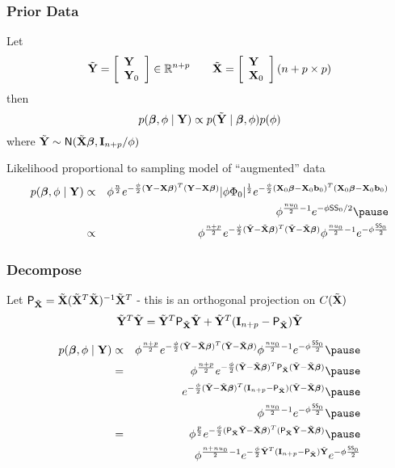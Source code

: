 \documentclass[handout]{beamer}\usepackage[]{graphicx}\usepackage[]{color}
\begin{document}
\begin{frame}
  \frametitle{Prior Data}
  Let
 $$\tilde{\mathbf{Y}} = \left[
   \begin{array}{l}
     \mathbf{Y} \\
\mathbf{Y}_0
   \end{array}
\right] \in \mathbb{R}^{n+p}  \qquad \tilde{\mathbf{X}} = \left[
   \begin{array}{l}
     \mathbf{Y} \\
\mathbf{X}_0
   \end{array}
\right]  (n+p \times p)  $$  \pause
then
$$p(\boldsymbol{\beta}, \phi \mid \mathbf{Y}) \propto p(\tilde{\mathbf{Y}} \mid \boldsymbol{\beta}, \phi) p(\phi)$$
where  $\tilde{\mathbf{Y}} \sim \textsf{N}( \tilde{\mathbf{X}} \boldsymbol{\beta}, \mathbf{I}_{n+p}/\phi)$
\pause

\vspace{24pt}
Likelihood proportional to sampling model of ``augmented'' data
\pause
\begin{eqnarray*}
 p(\b, \phi \mid \Y) &\propto&  \phi^{\frac n 2} e^{- \frac \phi 2 (\Y - \X \b)^T (\Y - \X \b)}
 |\phi \Phi_0|^{\frac 1 2} e^{- \frac{\phi}{2} (\X_0\b - \X_0\bv_0)^T  (\X_0\b - \X_0\bv_0) }  \\
& &  \phi^{\frac{nu_0}{2} - 1} e^{-\phi \SS_0/2} \pause \\
 &\propto&  \phi^{\frac {n + p}{ 2}} e^{- \frac \phi 2 (\tY - \tX \b)^T (\tY - \tX \b)}
\phi^{\frac{nu_0}{2} - 1} e^{-\phi \frac{ \SS_0}{ 2}}
  \end{eqnarray*}
\end{frame}
\begin{frame}
  \frametitle{Decompose}
  Let $\textsf{P}_{\tilde{\mathbf{X}}} = \tilde{\mathbf{X}} (\tilde{\mathbf{X}}^T\tilde{\mathbf{X}})^{-1} \tilde{\mathbf{X}}^T$ \pause -  this is an orthogonal
  projection on $C(\tilde{\mathbf{X}})$ \pause
 $$\tilde{\mathbf{Y}}^T\tilde{\mathbf{Y}} = \tilde{\mathbf{Y}}^T\textsf{P}_{\tilde{\mathbf{X}}}\tilde{\mathbf{Y}} +
  \tilde{\mathbf{Y}}^T(\mathbf{I}_{n+p} - \textsf{P}_{\tilde{\mathbf{X}}} )\tilde{\mathbf{Y}}$$

\pause

\begin{eqnarray*}
 p(\b, \phi \mid \Y)
 &\propto&  \phi^{\frac {n + p}{ 2}} e^{- \frac \phi 2 (\tY - \tX \b)^T (\tY - \tX \b)}
\phi^{\frac{nu_0}{2} - 1} e^{-\phi \frac{ \SS_0}{ 2}} \pause \\
 & = &  \phi^{\frac {n + p}{ 2}} e^{- \frac \phi 2 (\tY - \tX \b)^T
   \P_{\tX} (\tY - \tX \b)} \pause \\
 & & e^{- \frac \phi 2 (\tY - \tX \b)^T (\I_{n+p} - \P_{\tX}) (\tY -
   \tX \b)} \pause \\
& & \phi^{\frac{nu_0}{2} - 1} e^{-\phi \frac{ \SS_0}{ 2}} \pause \\
& = &  \phi^{\frac {p}{ 2}} e^{- \frac{\phi} {2}
(\P_{\tX}\tY - \tX \b)^T (\P_{\tX}\tY - \tX \b)} \pause \\
& & \phi^{\frac{n + nu_0}{2} - 1} e^{- \frac \phi 2 \tY^T (\I_{n +p}
  -\P_{\tX}) \tY}  e^{-\phi \frac{ \SS_0}{ 2}}
  \end{eqnarray*}

\end{frame}
\end{document}
